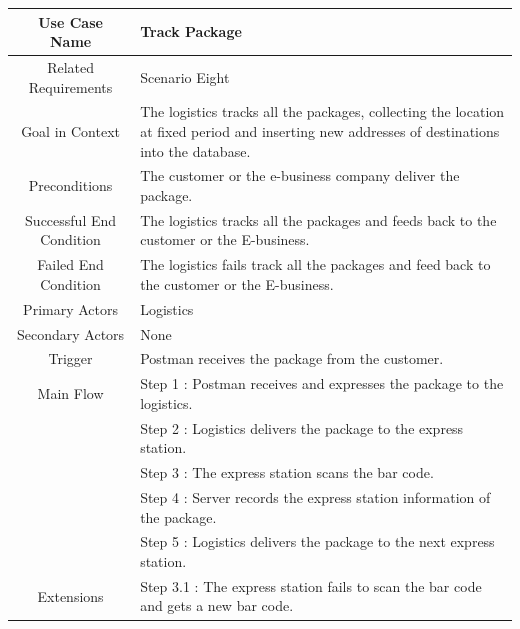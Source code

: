 \documentclass[12pt]{scrreprt}
\begin{document}
\begin{table}
  \centering
  \begin{tabular}{| c | p{11cm} |}
    \hline
    Use Case Name & Track Package\\
    \hline
    Related Requirements & Scenario Eight\\
    \hline
    Goal in Context & The logistics tracks all the packages, collecting the
    location at fixed period and inserting new addresses of destinations into
    the database.\\
    \hline
    Preconditions & The customer or the e-business company deliver the package.\\
    \hline
    Successful End Condition & The logistics tracks all the packages and feeds
    back to the customer or the E-business.\\
    \hline
    Failed End Condition & The logistics fails track all the packages and feed
    back to the customer or the E-business.\\
    \hline
    Primary Actors & Logistics\\
    \hline
    Secondary Actors & None\\
    \hline
    Trigger & Postman receives the package from the customer.\\
    \hline
    Main Flow & Step 1 : Postman receives and expresses the package to the
    logistics.\\
    & Step 2 : Logistics delivers the package to the express station.\\
    & Step 3 : The express station  scans the bar code.\\
    & Step 4 : Server records the express station information of the package.\\
    & Step 5 : Logistics delivers the package to the next express station.\\
    \hline
    Extensions & Step 3.1 : The express station fails to scan the bar code
    and gets a new bar code.\\
    \hline
  \end{tabular}
\end{table}
\end{document}
